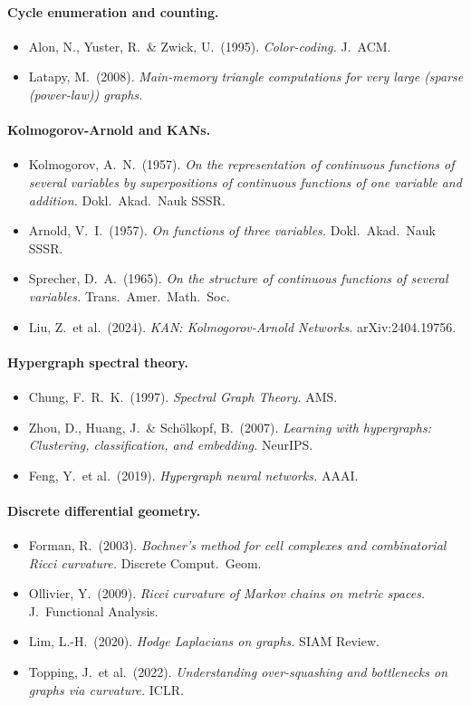 \documentclass[11pt,a4paper]{article}
\theoremstyle{remark}
\begin{document}
\paragraph{Cycle enumeration and counting.}
\begin{itemize}
\item Alon, N., Yuster, R.\ \& Zwick, U.\ (1995). \emph{Color-coding.} J.\ ACM.
\item Latapy, M.\ (2008). \emph{Main-memory triangle computations for very large (sparse (power-law)) graphs.}
\end{itemize}

\paragraph{Kolmogorov-Arnold and KANs.}
\begin{itemize}
\item Kolmogorov, A.\ N.\ (1957). \emph{On the representation of continuous functions of several variables by superpositions of continuous functions of one variable and addition.} Dokl.\ Akad.\ Nauk SSSR.
\item Arnold, V.\ I.\ (1957). \emph{On functions of three variables.} Dokl.\ Akad.\ Nauk SSSR.
\item Sprecher, D.\ A.\ (1965). \emph{On the structure of continuous functions of several variables.} Trans.\ Amer.\ Math.\ Soc.
\item Liu, Z.\ et al.\ (2024). \emph{KAN: Kolmogorov-Arnold Networks.} arXiv:2404.19756.
\end{itemize}

\paragraph{Hypergraph spectral theory.}
\begin{itemize}
\item Chung, F.\ R.\ K.\ (1997). \emph{Spectral Graph Theory.} AMS.
\item Zhou, D., Huang, J.\ \& Sch\"olkopf, B.\ (2007). \emph{Learning with hypergraphs: Clustering, classification, and embedding.} NeurIPS.
\item Feng, Y.\ et al.\ (2019). \emph{Hypergraph neural networks.} AAAI.
\end{itemize}

\paragraph{Discrete differential geometry.}
\begin{itemize}
\item Forman, R.\ (2003). \emph{Bochner's method for cell complexes and combinatorial Ricci curvature.} Discrete Comput.\ Geom.
\item Ollivier, Y.\ (2009). \emph{Ricci curvature of Markov chains on metric spaces.} J.\ Functional Analysis.
\item Lim, L.-H.\ (2020). \emph{Hodge Laplacians on graphs.} SIAM Review.
\item Topping, J.\ et al.\ (2022). \emph{Understanding over-squashing and bottlenecks on graphs via curvature.} ICLR.
\end{itemize}
\end{document}
